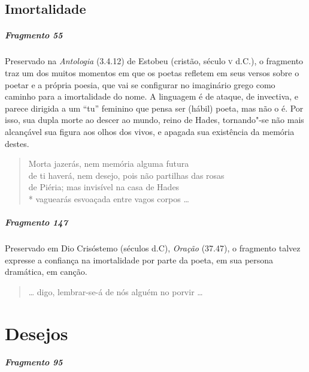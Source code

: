 \section{Imortalidade}

\paragraph{Fragmento 55}

{\small Preservado na \textit{Antologia} (3.4.12) de Estobeu (cristão, século \textsc{v} d.C.), o fragmento traz um dos muitos momentos em que os poetas refletem em seus versos
sobre o poetar e a própria poesia, que vai se configurar no imaginário grego
como caminho para a imortalidade do nome. A linguagem é de ataque, de
invectiva, e parece dirigida a um “tu” feminino que pensa ser (hábil) poeta, mas
não o é. Por isso, sua dupla morte ao descer ao mundo, reino de
Hades, tornando"-se não mais alcançável sua figura aos olhos dos vivos, e
apagada sua existência da memória destes.}

\begin{verse}
Morta jazerás, nem memória alguma futura\\
de ti haverá, nem desejo, pois não partilhas \qb{}das rosas\\
de Piéria; mas invisível na casa de Hades\\*
vaguearás esvoaçada entre vagos corpos \ldots{}
\end{verse}

\paragraph{Fragmento 147}

{\small Preservado em Dio Crisóstemo (séculos  d.C), \textit{Oração} (37.47), o fragmento talvez expresse a confiança na imortalidade por parte da poeta, em sua persona dramática, em canção.}

\begin{verse}
\ldots{} digo, lembrar-se-á de nós alguém no \qb{}porvir \ldots{}
\end{verse}

\chapter{Desejos}

\paragraph{Fragmento 95}

